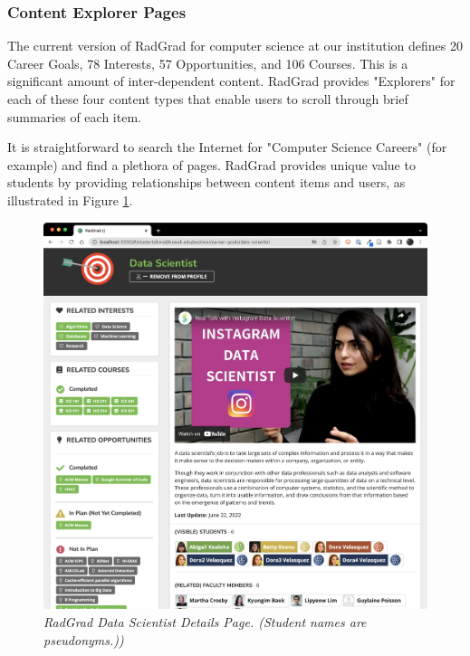 \documentclass[acmsmall,nonacm]{acmart}
\begin{document}
\subsubsection{Content Explorer Pages}

The current version of RadGrad for computer science at our institution defines 20 Career Goals, 78 Interests, 57 Opportunities, and 106 Courses. This is a significant amount of inter-dependent content.  RadGrad provides "Explorers" for each of these four content types that enable users to scroll through brief summaries of each item.

It is straightforward to search the Internet for "Computer Science Careers" (for example) and find a plethora of pages. RadGrad provides unique value to students by providing relationships between content items and users, as illustrated in Figure \ref{fig:radgrad-data-scientist-detail}.

\begin{figure}[ht]
\centering
\includegraphics[width=\linewidth]{data-scientist-detail.png}
\caption{\em RadGrad Data Scientist Details Page. (Student names are pseudonyms.))}
\label{fig:radgrad-data-scientist-detail}
\end{figure}
\end{document}
